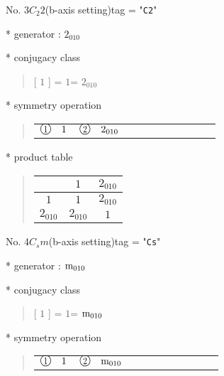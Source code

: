 \documentclass[fleqn,10pt,landscape]{jsarticle}
\begin{document}
\newpage

No. 3\quad$C_{2}$\quad$2$\quad(b-axis setting)\quad[ monoclinic ]
tag = "{\tt C2}"

* generator : $2{}_{010}$

* conjugacy class
\begin{quote}
[ $1$ ] = \quad $1$\newline[ $2{}_{010}$ ] = \quad $2{}_{010}$\newline
\end{quote}

* symmetry operation
\begin{quote}
\begin{tabular}{llllllllll}
$ {\ooalign{\hfil\resizebox{.8\width}{\height}{1}\hfil\crcr\raise.1ex\hbox{\large$\bigcirc$}}}\quad 1 $ & $ {\ooalign{\hfil\resizebox{.8\width}{\height}{2}\hfil\crcr\raise.1ex\hbox{\large$\bigcirc$}}}\quad 2{}_{010} $
\end{tabular}
\end{quote}

* product table
\begin{quote}
\begin{tabular}{ccc} \hline \hline
 & $ 1 $ & $ 2{}_{010} $ \\ \hline
$ 1 $ & $ 1 $ & $ 2{}_{010} $ \\
$ 2{}_{010} $ & $ 2{}_{010} $ & $ 1 $ \\
 \hline \hline
\end{tabular}
\end{quote}

\newpage

No. 4\quad$C_{s}$\quad$m$\quad(b-axis setting)\quad[ monoclinic ]
tag = "{\tt Cs}"

* generator : ${\rm m}_{010}$

* conjugacy class
\begin{quote}
[ $1$ ] = \quad $1$\newline[ ${\rm m}_{010}$ ] = \quad ${\rm m}_{010}$\newline
\end{quote}

* symmetry operation
\begin{quote}
\begin{tabular}{llllllllll}
$ {\ooalign{\hfil\resizebox{.8\width}{\height}{1}\hfil\crcr\raise.1ex\hbox{\large$\bigcirc$}}}\quad 1 $ & $ {\ooalign{\hfil\resizebox{.8\width}{\height}{2}\hfil\crcr\raise.1ex\hbox{\large$\bigcirc$}}}\quad {\rm m}_{010} $
\end{tabular}
\end{quote}
\end{document}
